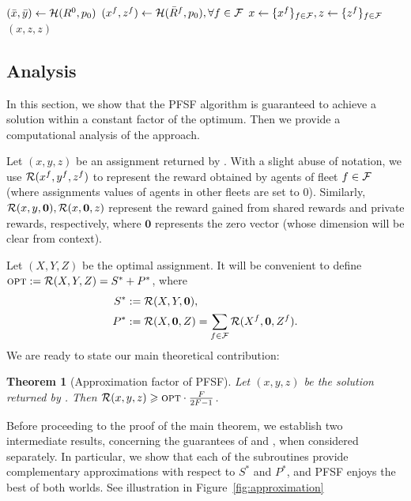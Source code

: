 \documentclass[conference]{IEEEtran}
\newtheorem{theorem}{Theorem}[section]
\begin{document}
\begin{algorithm}[!ht]
    $(\bar{x},\bar{y})\gets \mathcal{H}(R^0,p_0)$\; 
  $(x^f,z^f)\gets \mathcal{H}(\bar{R}^f,p_0), \forall f\in \mathcal{F}$\;
  $x\gets \{x^f\}_{f\in \mathcal{F}},z\gets\{z^f\}_{f\in \mathcal{F}}$\;
  \Return $(x,z,z)$\;
  \caption{$\shared(\dR,p_0)$}
  \label{alg:shared}
\end{algorithm} 

\subsection{Analysis}
In this section, we show that the PFSF algorithm is guaranteed to achieve a solution within a constant factor of the optimum. Then we provide a computational analysis of the approach.

Let $(x,y,z)$ be an assignment returned by \alg. With a slight abuse of notation, we use $\mathcal{R}(x^f,y^f,z^f)$ to represent the reward obtained by agents of fleet $f\in \mathcal{F}$ (where assignments values of agents in other fleets are set to $0$). Similarly, $\mathcal{R}(x,y,\bm{0}), \mathcal{R}(x,\bm{0},z)$ represent the reward gained from shared rewards and private rewards, respectively, where $\bm{0}$ represents the zero vector (whose dimension will be clear from context). 

Let $(X,Y,Z)$ be the optimal assignment. It will be convenient to define
$\textsc{opt}:=\mathcal{R}(X,Y,Z)=S^*+P^*$, where 
\begin{align*}S^*&:=\mathcal{R}(X,Y,\bm{0}), \\ P^*&:=\mathcal{R}(X,\bm{0},Z)=\sum_{f\in \mathcal{F}}\mathcal{R}({X}^f,\bm{0},{Z}^f).\end{align*}
We are ready to state our main theoretical contribution:

\begin{theorem}[Approximation factor of PFSF]\label{thm:main}
  Let $(x,y,z)$ be the solution returned by \alg. Then $\mathcal{R}(x,y,z)\geqslant \textsc{opt}\cdot \frac{F}{2F-1}$. 
\end{theorem}

Before proceeding to the proof of the main theorem, we establish two intermediate results, concerning the guarantees of \private and \shared, when considered separately. In particular, we show that each of the subroutines provide complementary approximations with respect to $S^*$ and $P^*$, and PFSF enjoys the best of both worlds. See illustration in Figure~\ref{fig:approximation}
\end{document}
